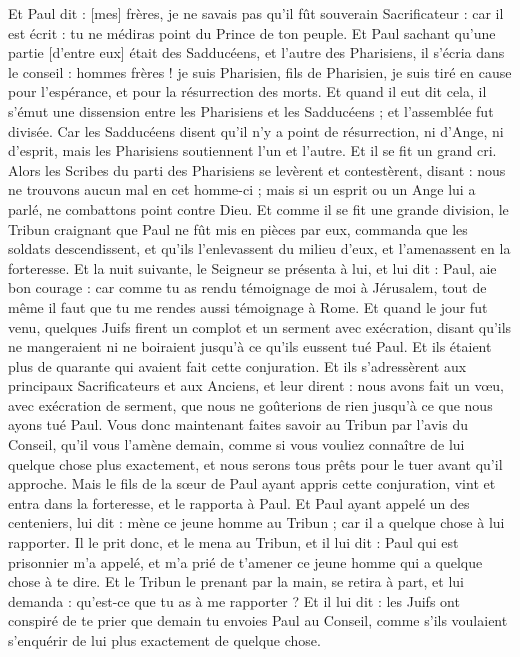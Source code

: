 \begin{multicols}{2}
Et Paul dit : [mes] frères, je ne savais pas qu'il fût souverain Sacrificateur : car il est écrit : tu ne médiras point du Prince de ton peuple.
Et Paul sachant qu'une partie [d'entre eux] était des Sadducéens, et l'autre des Pharisiens, il s'écria dans le conseil : hommes frères ! je suis Pharisien, fils de Pharisien, je suis tiré en cause pour l'espérance, et pour la résurrection des morts.
Et quand il eut dit cela, il s'émut une dissension entre les Pharisiens et les Sadducéens ; et l'assemblée fut divisée.
Car les Sadducéens disent qu'il n'y a point de résurrection, ni d'Ange, ni d'esprit, mais les Pharisiens soutiennent l'un et l'autre.
Et il se fit un grand cri. Alors les Scribes du parti des Pharisiens se levèrent et contestèrent, disant : nous ne trouvons aucun mal en cet homme-ci ; mais si un esprit ou un Ange lui a parlé, ne combattons point contre Dieu.
Et comme il se fit une grande division, le Tribun craignant que Paul ne fût mis en pièces par eux, commanda que les soldats descendissent, et qu'ils l'enlevassent du milieu d'eux, et l'amenassent en la forteresse.
Et la nuit suivante, le Seigneur se présenta à lui, et lui dit : Paul, aie bon courage : car comme tu as rendu témoignage de moi à Jérusalem, tout de même il faut que tu me rendes aussi témoignage à Rome.
Et quand le jour fut venu, quelques Juifs firent un complot et un serment avec exécration, disant qu'ils ne mangeraient ni ne boiraient jusqu'à ce qu'ils eussent tué Paul.
Et ils étaient plus de quarante qui avaient fait cette conjuration.
Et ils s'adressèrent aux principaux Sacrificateurs et aux Anciens, et leur dirent : nous avons fait un vœu, avec exécration de serment, que nous ne goûterions de rien jusqu'à ce que nous ayons tué Paul.
Vous donc maintenant faites savoir au Tribun par l'avis du Conseil, qu'il vous l'amène demain, comme si vous vouliez connaître de lui quelque chose plus exactement, et nous serons tous prêts pour le tuer avant qu'il approche.
Mais le fils de la sœur de Paul ayant appris cette conjuration, vint et entra dans la forteresse, et le rapporta à Paul.
Et Paul ayant appelé un des centeniers, lui dit : mène ce jeune homme au Tribun ; car il a quelque chose à lui rapporter.
Il le prit donc, et le mena au Tribun, et il lui dit : Paul qui est prisonnier m'a appelé, et m'a prié de t'amener ce jeune homme qui a quelque chose à te dire.
Et le Tribun le prenant par la main, se retira à part, et lui demanda : qu'est-ce que tu as à me rapporter ?
Et il lui dit : les Juifs ont conspiré de te prier que demain tu envoies Paul au Conseil, comme s'ils voulaient s'enquérir de lui plus exactement de quelque chose.

\end{multicols}
